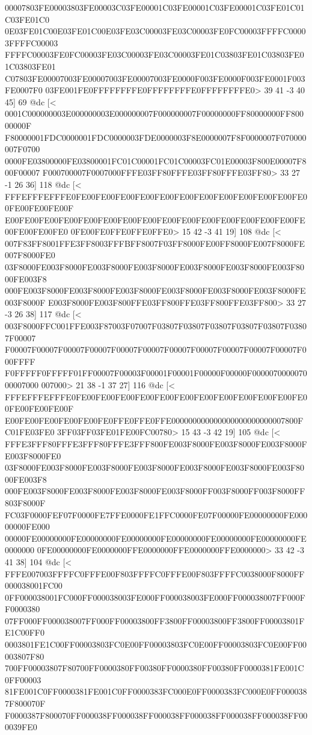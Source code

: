 00007803FE00003803FE00003C03FE00001C03FE00001C03FE00001C03FE01C01C03FE01C0
0E03FE01C00E03FE01C00E03FE03C00003FE03C00003FE0FC00003FFFFC00003FFFFC00003
FFFFC00003FE0FC00003FE03C00003FE03C00003FE01C03803FE01C03803FE01C03803FE01
C07803FE00007003FE00007003FE00007003FE0000F003FE0000F003FE0001F003FE0007F0
03FE001FE0FFFFFFFFE0FFFFFFFFE0FFFFFFFFE0>
	 39 41 -3 40 45] 69 @dc
[<
0001C000000003E000000003E000000007F000000007F00000000FF80000000FF80000000F
F80000001FDC0000001FDC0000003FDE0000003F8E0000007F8F0000007F070000007F0700
0000FE03800000FE03800001FC01C00001FC01C00003FC01E00003F800E00007F800F00007
F000700007F0007000FFFE03FF80FFFE03FF80FFFE03FF80>
	 33 27 -1 26 36] 118 @dc
[<
FFFEFFFEFFFE0FE00FE00FE00FE00FE00FE00FE00FE00FE00FE00FE00FE00FE00FE00FE00F
E00FE00FE00FE00FE00FE00FE00FE00FE00FE00FE00FE00FE00FE00FE00FE00FE00FE00FE0
0FE00FE0FFE0FFE0FFE0>
	 15 42 -3 41 19] 108 @dc
[<
007F83FF8001FFE3FF8003FFFBFF8007F03FF8000FE00FF8000FE007F8000FE007F8000FE0
03F8000FE003F8000FE003F8000FE003F8000FE003F8000FE003F8000FE003F8000FE003F8
000FE003F8000FE003F8000FE003F8000FE003F8000FE003F8000FE003F8000FE003F8000F
E003F8000FE003F800FFE03FF800FFE03FF800FFE03FF800>
	 33 27 -3 26 38] 117 @dc
[<
003F8000FFC001FFE003F87003F07007F03807F03807F03807F03807F03807F03807F00007
F00007F00007F00007F00007F00007F00007F00007F00007F00007F00007F00007F000FFFF
F0FFFFF0FFFFF01FF00007F00003F00001F00001F00000F00000F000007000007000007000
007000>
	 21 38 -1 37 27] 116 @dc
[<
FFFEFFFEFFFE0FE00FE00FE00FE00FE00FE00FE00FE00FE00FE00FE00FE00FE00FE00FE00F
E00FE00FE00FE00FE00FE0FFE0FFE0FFE000000000000000000000000007800FC01FE03FE0
3FF03FF03FE01FE00FC00780>
	 15 43 -3 42 19] 105 @dc
[<
FFFE3FFF80FFFE3FFF80FFFE3FFF800FE003F8000FE003F8000FE003F8000FE003F8000FE0
03F8000FE003F8000FE003F8000FE003F8000FE003F8000FE003F8000FE003F8000FE003F8
000FE003F8000FE003F8000FE003F8000FE003F8000FF003F8000FF003F8000FF803F8000F
FC03F0000FEF07F0000FE7FFE0000FE1FFC0000FE07F00000FE00000000FE00000000FE000
00000FE00000000FE00000000FE00000000FE00000000FE00000000FE00000000FE0000000
0FE00000000FE0000000FFE0000000FFE0000000FFE0000000>
	 33 42 -3 41 38] 104 @dc
[<
FFFE007003FFFFC0FFFE00F803FFFFC0FFFE00F803FFFFC0038000F8000FF000038001FC00
0FF000038001FC000FF000038003FE000FF000038003FE000FF000038007FF000FF0000380
07FF000FF000038007FF000FF00003800FF3800FF00003800FF3800FF00003801FE1C00FF0
0003801FE1C00FF00003803FC0E00FF00003803FC0E00FF00003803FC0E00FF00003807F80
700FF00003807F80700FF0000380FF00380FF0000380FF00380FF0000381FE001C0FF00003
81FE001C0FF0000381FE001C0FF0000383FC000E0FF0000383FC000E0FF0000387F800070F
F0000387F800070FF000038FF000038FF000038FF000038FF000038FF000038FF000039FE0
